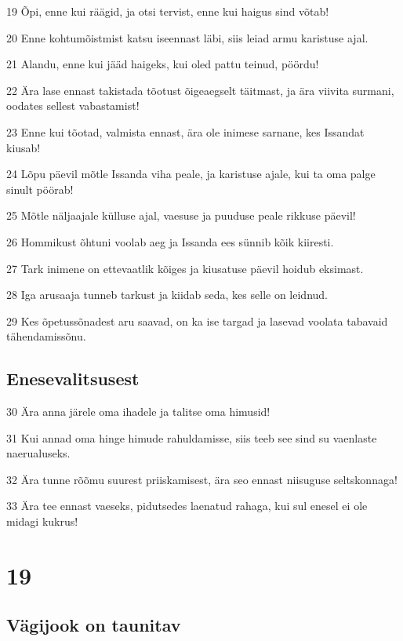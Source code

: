 \par 19 Õpi, enne kui räägid, ja otsi tervist, enne kui haigus sind võtab!
\par 20 Enne kohtumõistmist katsu iseennast läbi, siis leiad armu karistuse ajal.
\par 21 Alandu, enne kui jääd haigeks, kui oled pattu teinud, pöördu!
\par 22 Ära lase ennast takistada tõotust õigeaegselt täitmast, ja ära viivita surmani, oodates sellest vabastamist!
\par 23 Enne kui tõotad, valmista ennast, ära ole inimese sarnane, kes Issandat kiusab!
\par 24 Lõpu päevil mõtle Issanda viha peale, ja karistuse ajale, kui ta oma palge sinult pöörab!
\par 25 Mõtle näljaajale külluse ajal, vaesuse ja puuduse peale rikkuse päevil!
\par 26 Hommikust õhtuni voolab aeg ja Issanda ees sünnib kõik kiiresti.
\par 27 Tark inimene on ettevaatlik kõiges ja kiusatuse päevil hoidub eksimast.
\par 28 Iga arusaaja tunneb tarkust ja kiidab seda, kes selle on leidnud.
\par 29 Kes õpetussõnadest aru saavad, on ka ise targad ja lasevad voolata tabavaid tähendamissõnu.

\section*{Enesevalitsusest}

\par 30 Ära anna järele oma ihadele ja talitse oma himusid!
\par 31 Kui annad oma hinge himude rahuldamisse, siis teeb see sind su vaenlaste naerualuseks.
\par 32 Ära tunne rõõmu suurest priiskamisest, ära seo ennast niisuguse seltskonnaga!
\par 33 Ära tee ennast vaeseks, pidutsedes laenatud rahaga, kui sul enesel ei ole midagi kukrus!

\chapter{19}

\section*{Vägijook on taunitav}

